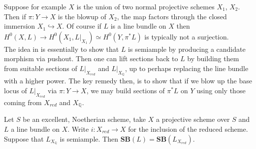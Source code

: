 \documentclass[a4paper,12pt]{book}
\newcommand{\SB}{\mathbf{SB}}
\begin{document}
Suppose for example $X$ is the union of two normal projective schemes $X_{1}$, $X_{2}$. Then if $\pi:Y \to X$ is the blowup of $X_{2}$, the map factors through the closed immersion $X_{1} \hookrightarrow X$. Of course if $L$ is a line bundle on $X$ then $H^{0}(X,L) \to H^{0}(X_{1},L|_{X_{1}})\simeq H^{0}(Y,\pi^{*}L)$ is typically not a surjection.\\

 The idea in \cite[Thereom 1.10]{witaszek2020keel} is essentially to show that $L$ is semiample by producing a candidate morphism via pushout. Then one can lift sections back to $L$ by building them from suitable sections of $L|_{X_{red}}$ and $L|_{X_{\mathbb{Q}}}$, up to perhaps replacing the line bundle with a higher power. The key remedy then, is to show that if we blow up the base locus of $L|_{X_{red}}$ via $\pi:Y \to X$, we may build sections of $\pi^{*}L$ on $Y$ using only those coming from $X_{red}$ and $X_{\mathbb{Q}}$.\\

\begin{theorem}\label{BaseRed}
		Let $S$ be an excellent, Noetherian scheme, take $X$ a projective scheme over $S$ and $L$ a line bundle on $X$. Write $i:X_{red} \to X$ for the inclusion of the reduced scheme. Suppose that $L_{X_{\mathbb{Q}}}$ is semiample. Then $\SB(L)=\SB(L_{X_{red}})$.
\end{theorem}
\end{document}
